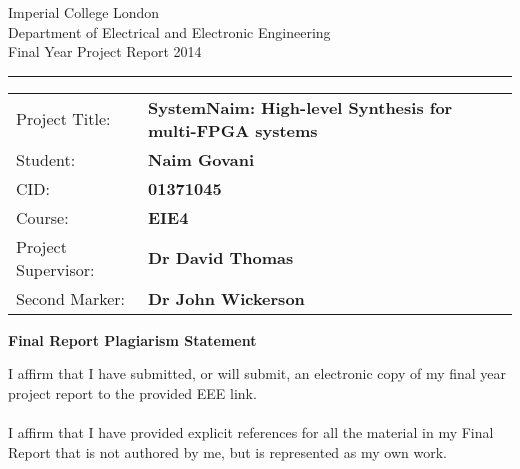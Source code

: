 \documentclass[a4paper, twoside]{report}
\begin{document}
    \begin{titlepage}
        \setlength{\parindent}{0pt}
        \setlength{\parskip}{0pt}

        {
                        \Large
                        \raggedright
                        Imperial College London\\[17pt]
                        Department of Electrical and Electronic Engineering\\[17pt]
                        Final Year Project Report 2014\\[17pt]

        }

        \rule{\columnwidth}{3pt}
        \vfill
        \centering
        \vfill
        \setlength{\tabcolsep}{0pt}

        \begin{tabular}{p{40mm}p{\dimexpr\columnwidth-40mm}}
                        Project Title: & \textbf{SystemNaim: High-level Synthesis for multi-FPGA systems } \\[12pt]
                        Student: & \textbf{Naim Govani} \\[12pt]
                        CID: & \textbf{01371045} \\[12pt]
                        Course: & \textbf{EIE4} \\[12pt]
                        Project Supervisor: & \textbf{Dr David Thomas} \\[12pt]
                        Second Marker: & \textbf{Dr John Wickerson} \\
        \end{tabular}
    \end{titlepage}

    \begin{center}
        \textbf{\huge Final Report Plagiarism Statement }
    \end{center}

    \noindent I affirm that I have submitted, or will submit, an electronic copy of my final year project report to the provided EEE link. \\ \\
    I affirm that I have provided explicit references for all the material in my Final Report that is not authored by me, but is represented as my own work.
    \newpage
    
    \setlength{\parskip}{4pt}
    \setlength{\parindent}{4pt}
\end{document}
